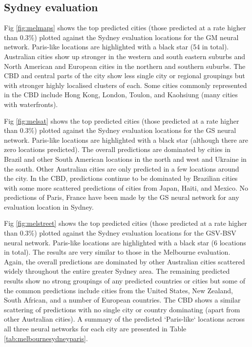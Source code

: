 \documentclass[10pt,letterpaper,hidelinks]{article}
\begin{document}
\subsection*{Sydney evaluation} 

Fig \ref{fig:melmaps} shows the top predicted cities (those predicted at a rate higher than 0.3\%) plotted against the Sydney evaluation locations for the GM neural network. Paris-like locations are highlighted with a black star (54 in total).  Australian cities show up stronger in the western and south eastern suburbs and North American and European cities in the northern and southern suburbs. The CBD and central parts of the city show less single city or regional groupings but with stronger highly localised clusters of each. Some cities commonly represented in the CBD include Hong Kong, London, Toulon, and Kaohsiung (many cities with waterfronts). 

Fig \ref{fig:melsat} shows the top predicted cities (those predicted at a rate higher than 0.3\%) plotted against the Sydney evaluation locations for the GS neural network. Paris-like locations are highlighted with a black star (although there are zero locations predicted). The overall predictions are dominated by cities in Brazil and other South American locations in the north and west and Ukraine in the south. Other Australian cities are only predicted in a few locations around the city. In the CBD, predictions continue to be dominated by Brazilian cities with some more scattered predictions of cities from Japan, Haiti, and Mexico. No predictions of Paris, France have been made by the GS neural network for any evaluation location in Sydney.

Fig \ref{fig:melstreet} shows the top predicted cities (those predicted at a rate higher than 0.3\%) plotted against the Sydney evaluation locations for the GSV-BSV neural network. Paris-like locations are highlighted with a black star (6 locations in total). The results are very similar to those in the Melbourne evaluation. Again, the overall predictions are dominated by other Australian cities scattered widely throughout the entire greater Sydney area. The remaining predicted results show no strong groupings of any predicted countries or cities but some of the common predictions include cities from the United States, New Zealand, South African, and a number of European countries. The CBD shows a similar scattering of predictions with no single city or country dominating (apart from other Australian cities). A summary of the predicted `Paris-like` locations across all three neural networks for each city are presented in Table \ref{tab:melbournesydneyparis}.
\end{document}
